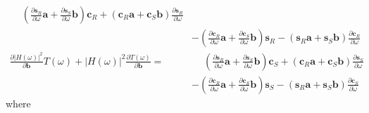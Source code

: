 \documentclass[a4paper,twoside,10pt,english]{report}
\begin{document}
\begin{align*}
\phantom{-}\left(\frac{\partial\boldsymbol{s}_{R}}{\partial\omega}\boldsymbol{a}+
      \frac{\partial\boldsymbol{s}_{S}}{\partial\omega}\boldsymbol{b}\right)
\boldsymbol{c}_{R}+
\left(\boldsymbol{c}_{R}\boldsymbol{a}+
      \boldsymbol{c}_{S}\boldsymbol{b}\right)
\frac{\partial\boldsymbol{s}_{R}}{\partial\omega}\\
&-\left(\frac{\partial\boldsymbol{c}_{R}}{\partial\omega}\boldsymbol{a}+
\frac{\partial\boldsymbol{c}_{S}}{\partial\omega}\boldsymbol{b}\right)
\boldsymbol{s}_{R}
-\left(\boldsymbol{s}_{R}\boldsymbol{a}+\boldsymbol{s}_{S}\boldsymbol{b}\right)
\frac{\partial\boldsymbol{c}_{R}}{\partial\omega}\\
\frac{\partial\left|H\left(\omega\right)\right|^{2}}{\partial\boldsymbol{b}}
T\left(\omega\right)+\left|H\left(\omega\right)\right|^{2}
\frac{\partial T\left(\omega\right)}{\partial\boldsymbol{b}} =& 
\phantom{-}\left(\frac{\partial\boldsymbol{s}_{R}}{\partial\omega}\boldsymbol{a}+
      \frac{\partial\boldsymbol{s}_{S}}{\partial\omega}\boldsymbol{b}\right)
\boldsymbol{c}_{S}+
\left(\boldsymbol{c}_{R}\boldsymbol{a}+
      \boldsymbol{c}_{S}\boldsymbol{b}\right)
\frac{\partial\boldsymbol{s}_{S}}{\partial\omega}\\
&-\left(\frac{\partial\boldsymbol{c}_{R}}{\partial\omega}\boldsymbol{a}+
\frac{\partial\boldsymbol{c}_{S}}{\partial\omega}\boldsymbol{b}\right)
\boldsymbol{s}_{S}
-\left(\boldsymbol{s}_{R}\boldsymbol{a}+\boldsymbol{s}_{S}\boldsymbol{b}\right)
\frac{\partial\boldsymbol{c}_{S}}{\partial\omega}
\end{align*}
where
\end{document}
